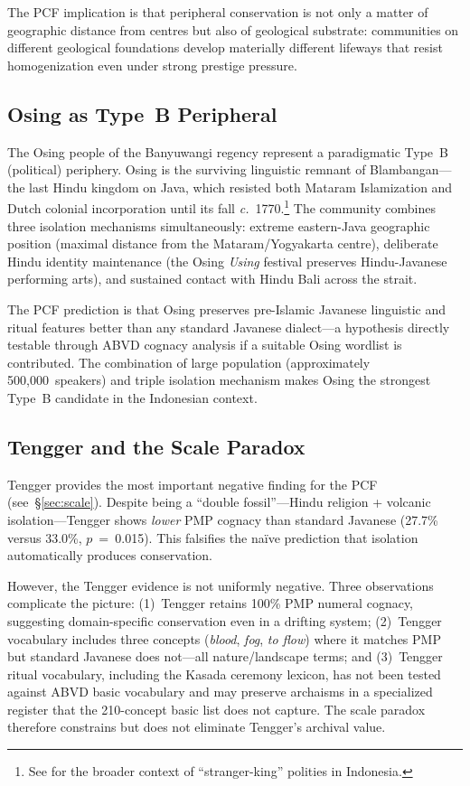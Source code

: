 \documentclass[12pt,a4paper]{article}
\begin{document}
The PCF implication is that peripheral conservation is not only a matter of geographic distance from centres but also of geological substrate: communities on different geological foundations develop materially different lifeways that resist homogenization even under strong prestige pressure.

\subsection{Osing as Type~B Peripheral}

The Osing people of the Banyuwangi regency represent a paradigmatic Type~B (political) periphery. Osing is the surviving linguistic remnant of Blambangan---the last Hindu kingdom on Java, which resisted both Mataram Islamization and Dutch colonial incorporation until its fall \textit{c.}~1770.\footnote{See \autocite{henley2004trousers} for the broader context of ``stranger-king'' polities in Indonesia.} The community combines three isolation mechanisms simultaneously: extreme eastern-Java geographic position (maximal distance from the Mataram/Yogyakarta centre), deliberate Hindu identity maintenance (the Osing \emph{Using} festival preserves Hindu-Javanese performing arts), and sustained contact with Hindu Bali across the strait.

The PCF prediction is that Osing preserves pre-Islamic Javanese linguistic and ritual features better than any standard Javanese dialect---a hypothesis directly testable through ABVD cognacy analysis if a suitable Osing wordlist is contributed. The combination of large population (approximately 500,000~speakers) and triple isolation mechanism makes Osing the strongest Type~B candidate in the Indonesian context.

\subsection{Tengger and the Scale Paradox}

Tengger provides the most important negative finding for the PCF (see~\S\ref{sec:scale}). Despite being a ``double fossil''---Hindu religion + volcanic isolation---Tengger shows \emph{lower} PMP cognacy than standard Javanese (27.7\% versus 33.0\%, $p$~=~0.015). This falsifies the na\"ive prediction that isolation automatically produces conservation.

However, the Tengger evidence is not uniformly negative. Three observations complicate the picture: (1)~Tengger retains 100\% PMP numeral cognacy, suggesting domain-specific conservation even in a drifting system; (2)~Tengger vocabulary includes three concepts (\emph{blood}, \emph{fog}, \emph{to flow}) where it matches PMP but standard Javanese does not---all nature/landscape terms; and (3)~Tengger ritual vocabulary, including the Kasada ceremony lexicon, has not been tested against ABVD basic vocabulary and may preserve archaisms in a specialized register that the 210-concept basic list does not capture. The scale paradox therefore constrains but does not eliminate Tengger's archival value.
\end{document}

